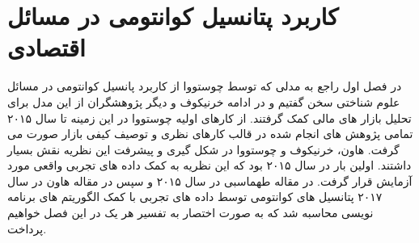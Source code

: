 \documentclass[a4paper,titlepage,12pt,fleqn,oneside]{report}
\begin{document}
	\chapter{کاربرد پتانسیل کوانتومی در مسائل اقتصادی}
	در فصل اول راجع به مدلی که توسط چوستووا از کاربرد پانسیل کوانتومی در مسائل علوم شناختی سخن گفتیم و در ادامه خرنیکوف و دیگر پژوهشگران از این مدل برای تحلیل بازار های مالی کمک گرفتند. از کارهای اولیه چوستووا در این زمینه تا سال ۲۰۱۵ تمامی پژوهش های انجام شده در قالب کارهای نظری و توصیف کیفی بازار صورت می گرفت. هاون، خرنیکوف و چوستووا در شکل گیری و پیشرفت این نظریه نقش بسیار داشتند. اولین بار در سال ۲۰۱۵ بود که این نظریه به کمک داده های تجربی واقعی مورد آزمایش قرار گرفت. در مقاله طهماسبی 
	\cite{tahmaseb}
	در سال ۲۰۱۵ و سپس در مقاله هاون
	\cite{shen}
	در سال ۲۰۱۷  پتانسیل های کوانتومی توسط داده های تجربی با کمک الگوریتم های برنامه نویسی محاسبه شد که به صورت اختصار به تفسیر هر یک در این فصل خواهیم پرداخت. 
	
\end{document}
